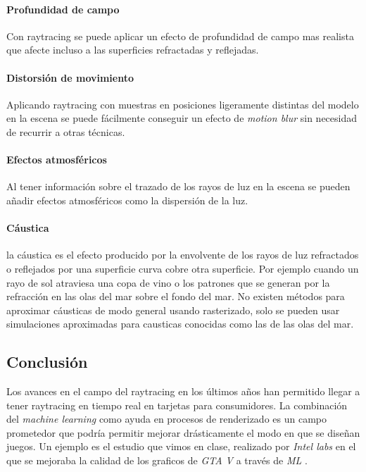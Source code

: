 \begin{pregunta}
\paragraph{Profundidad de campo} Con raytracing se puede aplicar un efecto de
profundidad de campo mas realista que afecte incluso a las superficies
refractadas y reflejadas.

\paragraph{Distorsión de movimiento} Aplicando raytracing con muestras en
posiciones ligeramente distintas del modelo en la escena se puede fácilmente
conseguir un efecto de \emph{motion blur} sin necesidad de recurrir a otras
técnicas.

\paragraph{Efectos atmosféricos} Al tener información sobre el trazado de los
rayos de luz en la escena se pueden añadir efectos atmosféricos como la
dispersión de la luz.

\paragraph{Cáustica} la cáustica es el efecto producido por la envolvente de los
rayos de luz refractados o reflejados por una superficie curva cobre otra
superficie. Por ejemplo cuando un rayo de sol atraviesa una copa de vino o los
patrones que se generan por la refracción en las olas del mar sobre el fondo del
mar. No existen métodos para aproximar cáusticas de modo general usando
rasterizado, solo se pueden usar simulaciones aproximadas para causticas conocidas
como las de las olas del mar.

\subsection*{Conclusión}

Los avances en el campo del raytracing en los últimos años han permitido llegar
a tener raytracing en tiempo real en tarjetas para consumidores. La combinación
del \emph{machine learning} como ayuda en procesos de renderizado es un campo
prometedor que podría permitir mejorar drásticamente el modo en que se diseñan
juegos. Un ejemplo es el estudio que vimos en clase, realizado por \emph{Intel
labs} en el que se mejoraba la calidad de los graficos de \emph{GTA V} a través
de \emph{ML} \cite{richter_enhancing_2021}.

\nocite{haines_ray_2019,haines_ray_2020}



\end{pregunta}
